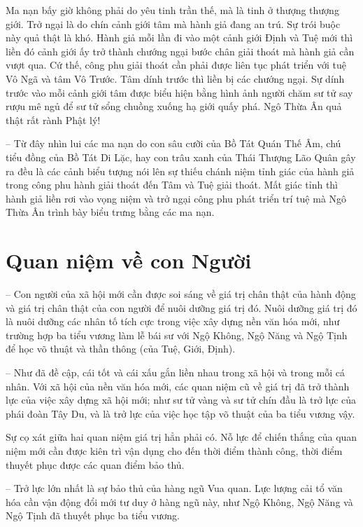 Ma nạn bấy giờ không phải do yêu tinh trần thế, mà là tinh ở thượng thượng giới. Trở ngại là do chín cảnh giới tâm mà hành giả đang an trú. Sự trói buộc này quả thật là khó. Hành giả mỗi lần đi vào một cảnh giới Định và Tuệ mới thì liền đó cảnh giới ấy trở thành chướng ngại bước chân giải thoát mà hành giả cần vượt qua. Cứ thế, công phu giải thoát cần phải được liên tục phát triển với tuệ Vô Ngã và tâm Vô Trước. Tâm dính trước thì liền bị các chướng ngại. Sự dính trước vào mỗi cảnh giới tâm được biểu hiện bằng hình ảnh người chăm sư tử say rượu mê ngủ để sư tử sổng chuồng xuống hạ giới quấy phá. Ngô Thừa Ân quả thật rất rành Phật lý!

-- Từ đây nhìn lui các ma nạn do con sâu cưỡi của Bồ Tát Quán Thế Âm, chú tiểu đồng của Bồ Tát Di Lặc, hay con trâu xanh của Thái Thượng Lão Quân gây ra đều là các cảnh biểu tượng nói lên sự thiếu chánh niệm tỉnh giác của hành giả trong công phu hành giải thoát đến Tâm và Tuệ giải thoát. Mất giác tỉnh thì hành giả liền rơi vào vọng niệm và trở ngại công phu phát triển trí tuệ mà Ngô Thừa Ân trình bày biểu trưng bằng các ma nạn.

\section{Quan niệm về con Người} %
\label{sec:88_89_90_con_nguoi}

-- Con người của xã hội mới cần được soi sáng về giá trị chân thật của hành động và giá trị chân thật của con người để nuôi dưỡng giá trị đó. Nuôi dưỡng giá trị đó là nuôi dưỡng các nhân tố tích cực trong việc xây dựng nền văn hóa mới, như trường hợp ba tiểu vương làm lễ bái sư với Ngộ Không, Ngộ Năng và Ngộ Tịnh để học võ thuật và thần thông (của Tuệ, Giới, Định).

-- Như đã đề cập, cái tốt và cái xấu gắn liền nhau trong xã hội và trong mỗi cá nhân. Với xã hội của nền văn hóa mới, các quan niệm cũ về giá trị đã trở thành lực của việc xây dựng xã hội mới; như sư tử vàng và sư tử chín đầu là trở lực của phái đoàn Tây Du, và là trở lực của việc học tập võ thuật của ba tiểu vương vậy.

Sự cọ xát giữa hai quan niệm giá trị hẳn phải có. Nỗ lực để chiến thắng của quan niệm mới cần được kiên trì vận dụng cho đến thời điểm thành công, thời điểm thuyết phục được các quan điểm bảo thủ.

-- Trở lực lớn nhất là sự bảo thủ của hàng ngũ Vua quan. Lực lượng cải tổ văn hóa cần vận động đổi mới tư duy ở hàng ngũ này, như Ngộ Không, Ngộ Năng và Ngộ Tịnh đã thuyết phục ba tiểu vương.

